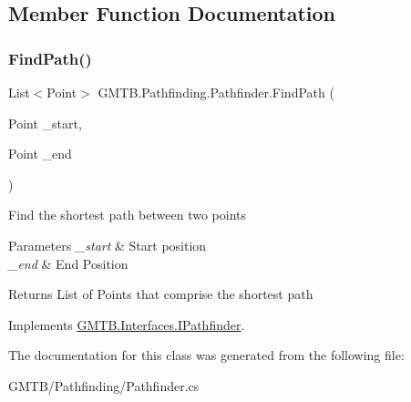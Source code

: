 \subsection{Member Function Documentation}
\mbox{\label{class_g_m_t_b_1_1_pathfinding_1_1_pathfinder_af65d294d194ccaeb70f31dd4b652393c}} 
\subsubsection{\texorpdfstring{FindPath()}{FindPath()}}
{\footnotesize\ttfamily List$<$Point$>$ G\+M\+T\+B.\+Pathfinding.\+Pathfinder.\+Find\+Path (\begin{DoxyParamCaption}\item[{Point}]{\+\_\+start,  }\item[{Point}]{\+\_\+end }\end{DoxyParamCaption})}



Find the shortest path between two points 


\begin{DoxyParams}{Parameters}
{\em \+\_\+start} & Start position\\
\hline
{\em \+\_\+end} & End Position\\
\hline
\end{DoxyParams}
\begin{DoxyReturn}{Returns}
List of Points that comprise the shortest path
\end{DoxyReturn}


Implements \mbox{\hyperlink{interface_g_m_t_b_1_1_interfaces_1_1_i_pathfinder}{G\+M\+T\+B.\+Interfaces.\+I\+Pathfinder}}.



The documentation for this class was generated from the following file\+:\begin{DoxyCompactItemize}
\item 
G\+M\+T\+B/\+Pathfinding/Pathfinder.\+cs\end{DoxyCompactItemize}
